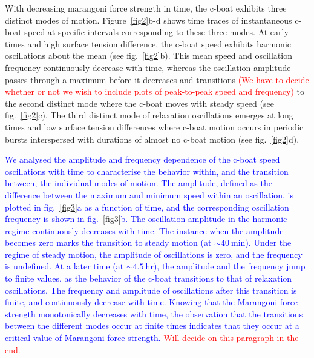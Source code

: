 \documentclass[journal=langd5, manuscript=article, layout=twocolumn]{achemso}
\begin{document}
With decreasing marangoni force strength in time, the c-boat exhibits three distinct modes of motion.  Figure~\ref{fig2}b-d shows time traces of instantaneous c-boat speed at specific intervals corresponding to these three modes. At early times and high surface tension difference, the c-boat speed exhibits harmonic oscillations about the mean (see fig.~\ref{fig2}b). This mean speed and oscillation frequency continuously decrease with time, whereas the oscillation amplitude passes through a maximum before it decreases and transitions \textcolor{red}{(We have to decide whether or not we wish to include plots of peak-to-peak speed and frequency)} to the second distinct mode where the c-boat moves with steady speed (see fig.~\ref{fig2}c). The third distinct mode of relaxation oscillations emerges at long times and low surface tension differences where c-boat motion occurs in periodic bursts interspersed with durations of almost no c-boat motion (see fig.~\ref{fig2}d).

\textcolor{blue}{We analysed the amplitude and frequency dependence of the c-boat speed oscillations with time to characterise the behavior within, and the transition between, the individual modes of motion. The amplitude, defined as the difference between the maximum and minimum speed within an oscillation, is plotted in fig.~\ref{fig3}a as a function of time, and the corresponding oscillation frequency is shown in fig.~\ref{fig3}b. The oscillation amplitude in the harmonic regime continuously decreases with time. The instance when the amplitude becomes zero marks the transition to steady motion (at $\sim 40\ \mathrm{min} $). Under the regime of steady motion, the amplitude of oscillations is zero, and the frequency is undefined. At a later time (at $\sim 4.5\ \mathrm{hr} $), the amplitude and the frequency jump to finite values, as the behavior of the c-boat transitions to that of relaxation oscillations. The frequency and amplitude of oscillations after this transition is finite, and continuously decrease with time. Knowing that the Marangoni force strength monotonically decreases with time, the observation that the transitions between the different modes occur at finite times indicates that they occur at a critical value of Marangoni force strength.} \textcolor{red}{Will decide on this paragraph in the end.}
\end{document}
